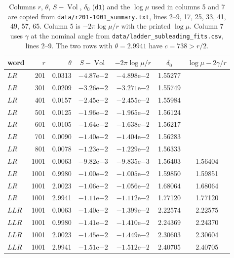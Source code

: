 \documentclass[11pt]{amsart}
\theoremstyle{definition}
\theoremstyle{remark}
\newcommand{\Vol}{\operatorname{Vol}}
\begin{document}
\begin{table}[ht]
\centering
\begin{tabular}{lrrcccc}
\toprule
word & $r$ & $\theta$ & $S - \Vol$ & $-2\pi\log\mu/r$ & $\delta_0$ & $\log\mu - 2\gamma/r$ \\
\midrule
$LR$  & 201  & 0.0313 & $-4.87\mathrm{e}{-2}$ & $-4.898\mathrm{e}{-2}$ & 1.55277 & \\
$LR$  & 301  & 0.0209 & $-3.26\mathrm{e}{-2}$ & $-3.271\mathrm{e}{-2}$ & 1.55749 & \\
$LR$  & 401  & 0.0157 & $-2.45\mathrm{e}{-2}$ & $-2.455\mathrm{e}{-2}$ & 1.55984 & \\
$LR$  & 501  & 0.0125 & $-1.96\mathrm{e}{-2}$ & $-1.965\mathrm{e}{-2}$ & 1.56124 & \\
$LR$  & 601  & 0.0105 & $-1.64\mathrm{e}{-2}$ & $-1.638\mathrm{e}{-2}$ & 1.56217 & \\
$LR$  & 701  & 0.0090 & $-1.40\mathrm{e}{-2}$ & $-1.404\mathrm{e}{-2}$ & 1.56283 & \\
$LR$  & 801  & 0.0078 & $-1.23\mathrm{e}{-2}$ & $-1.229\mathrm{e}{-2}$ & 1.56333 & \\
$LR$  & 1001 & 0.0063 & $-9.82\mathrm{e}{-3}$ & $-9.835\mathrm{e}{-3}$ & 1.56403 & 1.56404 \\
\midrule
$LR$  & 1001 & 0.9980 & $-1.00\mathrm{e}{-2}$ & $-1.005\mathrm{e}{-2}$ & 1.59850 & 1.59851 \\
$LR$  & 1001 & 2.0023 & $-1.06\mathrm{e}{-2}$ & $-1.056\mathrm{e}{-2}$ & 1.68064 & 1.68064 \\
$LR$  & 1001 & 2.9941 & $-1.11\mathrm{e}{-2}$ & $-1.112\mathrm{e}{-2}$ & 1.77120 & 1.77120 \\
$LLR$ & 1001 & 0.0063 & $-1.40\mathrm{e}{-2}$ & $-1.399\mathrm{e}{-2}$ & 2.22574 & 2.22575 \\
$LLR$ & 1001 & 0.9980 & $-1.41\mathrm{e}{-2}$ & $-1.410\mathrm{e}{-2}$ & 2.24369 & 2.24370 \\
$LLR$ & 1001 & 2.0023 & $-1.45\mathrm{e}{-2}$ & $-1.449\mathrm{e}{-2}$ & 2.30603 & 2.30604 \\
$LLR$ & 1001 & 2.9941 & $-1.51\mathrm{e}{-2}$ & $-1.512\mathrm{e}{-2}$ & 2.40705 & 2.40705 \\
\bottomrule
\end{tabular}
\caption{Columns $r$, $\theta$, $S-\Vol$, $\delta_0$ (\texttt{d1}) and the $\log\mu$
used in columns 5 and 7 are copied from \texttt{data/r201-1001\_summary.txt},
lines 2--9, 17, 25, 33, 41, 49, 57, 65. Column 5 is $-2\pi\log\mu/r$ with the
printed $\log\mu$. Column 7 uses $\gamma$ at the nominal angle from
\texttt{data/ladder\_subleading\_fits.csv}, lines 2--9. The two rows with
$\theta = 2.9941$ have $c = 738 > r/2$.}
\label{tab:summary}
\end{table}
\end{document}
